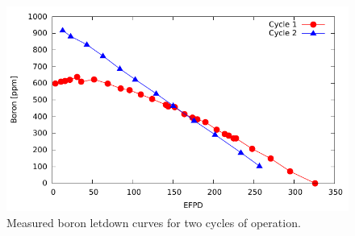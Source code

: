 \begin{figure}[htb]
  \centering
  \includegraphics[width=5.5in]{expdata/figs/boron_letdown.pdf}
  \caption{Measured boron letdown curves for two cycles of operation.
  \label{fig:boron_letdown}}
\end{figure}

